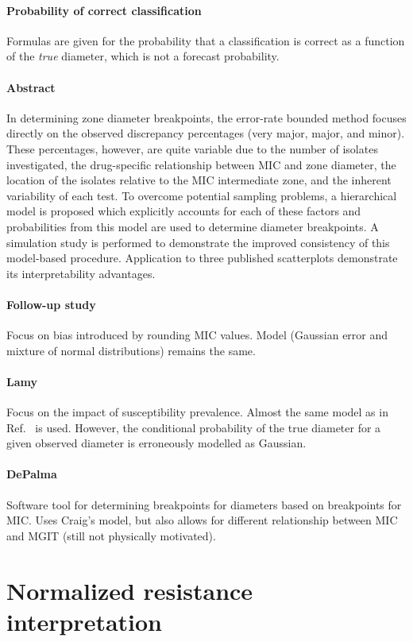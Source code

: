 \documentclass[a4paper]{article}
\begin{document}
\paragraph{Probability of correct classification} Formulas are given for the probability that a classification is correct as a function of the \emph{true} diameter, which is not a forecast probability.
\paragraph{Abstract} In determining zone diameter breakpoints, the error-rate bounded method focuses directly on the observed discrepancy percentages (very major, major, and minor). These percentages, however, are quite variable due to the number of isolates investigated, the drug-specific relationship between MIC and zone diameter, the location of the isolates relative to the MIC intermediate zone, and the inherent variability of each test. To overcome potential sampling problems, a hierarchical model is proposed which explicitly accounts for each of these factors and probabilities from this model are used to determine diameter breakpoints. A simulation study is performed to demonstrate the improved consistency of this model-based procedure. Application to three published scatterplots demonstrate its interpretability advantages.
\paragraph{Follow-up study \cite{Annis2005}} Focus on bias introduced by rounding MIC values. Model (Gaussian error and mixture of normal distributions) remains the same.
\paragraph{Lamy \cite{Lamy2004}} Focus on the impact of susceptibility prevalence. Almost the same model as in Ref.\ \cite{Craig2000} is used. However, the conditional probability of the true diameter for a given observed diameter is erroneously modelled as Gaussian.
\paragraph{DePalma \cite{Depalma2016,Depalma2016b}} Software tool for determining breakpoints for diameters based on breakpoints for MIC. Uses Craig's model, but also allows for different relationship between MIC and MGIT (still not physically motivated).

\section{Normalized resistance interpretation \cite{Kronvall2003}}
\end{document}
